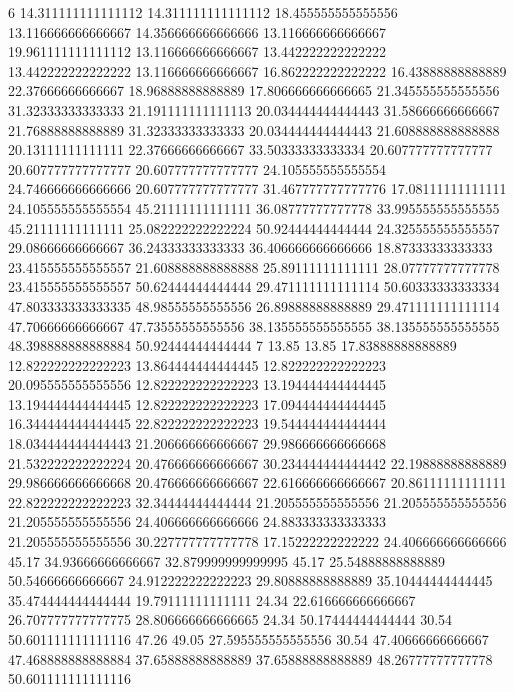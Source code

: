 6 14.311111111111112 14.311111111111112 18.455555555555556 13.116666666666667 14.356666666666666 13.116666666666667 19.961111111111112 13.116666666666667 13.442222222222222 13.442222222222222 13.116666666666667 16.862222222222222 16.43888888888889 22.37666666666667 18.96888888888889 17.806666666666665 21.345555555555556 31.32333333333333 21.191111111111113 20.034444444444443 31.58666666666667 21.76888888888889 31.32333333333333 20.034444444444443 21.608888888888888 20.13111111111111 22.37666666666667 33.50333333333334 20.607777777777777 20.607777777777777 20.607777777777777 24.105555555555554 24.746666666666666 20.607777777777777 31.467777777777776 17.08111111111111 24.105555555555554 45.21111111111111 36.08777777777778 33.995555555555555 45.21111111111111 25.082222222222224 50.92444444444444 24.325555555555557 29.08666666666667 36.24333333333333 36.406666666666666 18.87333333333333 23.415555555555557 21.608888888888888 25.89111111111111 28.07777777777778 23.415555555555557 50.62444444444444 29.471111111111114 50.60333333333334 47.803333333333335 48.98555555555556 26.89888888888889 29.471111111111114 47.70666666666667 47.73555555555556 38.135555555555555 38.135555555555555 48.398888888888884 50.92444444444444
7 13.85 13.85 17.83888888888889 12.822222222222223 13.864444444444445 12.822222222222223 20.095555555555556 12.822222222222223 13.194444444444445 13.194444444444445 12.822222222222223 17.094444444444445 16.344444444444445 22.822222222222223 19.544444444444444 18.034444444444443 21.206666666666667 29.986666666666668 21.532222222222224 20.476666666666667 30.234444444444442 22.19888888888889 29.986666666666668 20.476666666666667 22.616666666666667 20.86111111111111 22.822222222222223 32.34444444444444 21.205555555555556 21.205555555555556 21.205555555555556 24.406666666666666 24.883333333333333 21.205555555555556 30.227777777777778 17.15222222222222 24.406666666666666 45.17 34.93666666666667 32.879999999999995 45.17 25.54888888888889 50.54666666666667 24.912222222222223 29.80888888888889 35.10444444444445 35.474444444444444 19.79111111111111 24.34 22.616666666666667 26.707777777777775 28.806666666666665 24.34 50.17444444444444 30.54 50.601111111111116 47.26 49.05 27.595555555555556 30.54 47.40666666666667 47.468888888888884 37.65888888888889 37.65888888888889 48.26777777777778 50.601111111111116
